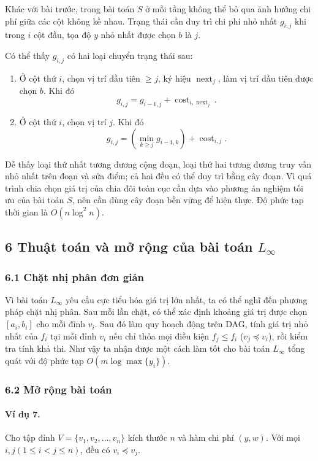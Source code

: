 \documentclass[11pt]{article}
\begin{document}
Khác với bài trước, trong bài toán \(S\) ở mỗi tầng không thể bỏ qua ảnh hưởng
chi phí giữa các cột không kề nhau. Trạng thái cần duy trì chi phí nhỏ nhất
\(g_{i,j}\) khi trong \(i\) cột đầu, tọa độ \(y\) nhỏ nhất được chọn \(b\) là
\(j\).

Có thể thấy \(g_{i,j}\) có hai loại chuyển trạng thái sau:
\begin{enumerate}
  \item Ở cột thứ \(i\), chọn vị trí đầu tiên \(\ge j\), ký hiệu
  \(\operatorname{next}_j\), làm vị trí đầu tiên được chọn \(b\). Khi đó
  \[
    g_{i,j}=g_{i-1,j}+\operatorname{cost}_{i,\operatorname{next}_j}.
  \]
  \item Ở cột thứ \(i\), chọn vị trí \(j\). Khi đó
  \[
    g_{i,j}=\left(\min_{k\ge j}g_{i-1,k}\right)+\operatorname{cost}_{i,j}.
  \]
\end{enumerate}
Dễ thấy loại thứ nhất tương đương cộng đoạn, loại thứ hai tương đương truy vấn
nhỏ nhất trên đoạn và sửa điểm; cả hai đều có thể duy trì bằng cây đoạn. Vì quá
trình chia chọn giá trị của chia đôi toàn cục cần dựa vào phương án nghiệm tối
ưu của bài toán \(S\), nên cần dùng cây đoạn bền vững để hiện thực. Độ phức tạp
thời gian là \(O(n\log^2 n)\).

\subsection*{6 Thuật toán và mở rộng của bài toán \(L_\infty\)}

\subsubsection*{6.1 Chặt nhị phân đơn giản}

Vì bài toán \(L_\infty\) yêu cầu cực tiểu hóa giá trị lớn nhất, ta có thể nghĩ
đến phương pháp chặt nhị phân. Sau mỗi lần chặt, có thể xác định khoảng giá trị
được chọn \([a_i,b_i]\) cho mỗi đỉnh \(v_i\). Sau đó làm quy hoạch động trên
DAG, tính giá trị nhỏ nhất của \(f_i\) tại mỗi đỉnh \(v_i\) nếu chỉ thỏa mọi
điều kiện \(f_j\le f_i\) (\(v_j\preceq v_i\)), rồi kiểm tra tính khả thi. Như
vậy ta nhận được một cách làm tốt cho bài toán \(L_\infty\) tổng quát với độ
phức tạp \(O(m\log\max\{y_i\})\).

\subsubsection*{6.2 Mở rộng bài toán}

\paragraph{Ví dụ 7.}
Cho tập đỉnh \(V=\{v_1,v_2,\ldots,v_n\}\) kích thước \(n\) và hàm chi phí
\((y,w)\). Với mọi \(i,j(1\le i<j\le n)\), đều có \(v_i\preceq v_j\).
\end{document}
